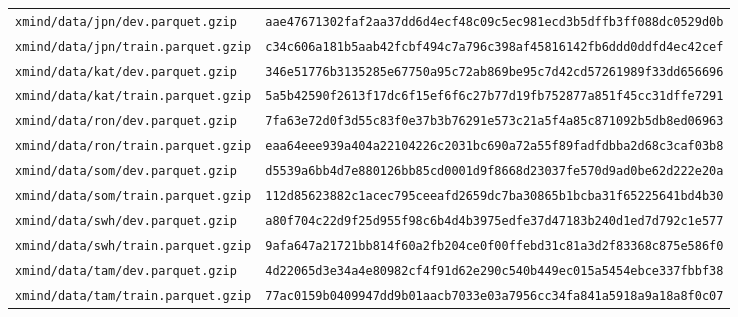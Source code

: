 \begin{longtable}{p{5.0cm}p{9.5cm}}
\texttt{\scriptsize xmind/data/jpn/dev.parquet.gzip} & \texttt{\scriptsize aae47671302faf2aa37dd6d4ecf48c09\hspace{0pt}c5ec981ecd3b5dffb3ff088dc0529d0b}\\
\texttt{\scriptsize xmind/data/jpn/train.parquet.gzip} & \texttt{\scriptsize c34c606a181b5aab42fcbf494c7a796c\hspace{0pt}398af45816142fb6ddd0ddfd4ec42cef}\\
\texttt{\scriptsize xmind/data/kat/dev.parquet.gzip} & \texttt{\scriptsize 346e51776b3135285e67750a95c72ab8\hspace{0pt}69be95c7d42cd57261989f33dd656696}\\
\texttt{\scriptsize xmind/data/kat/train.parquet.gzip} & \texttt{\scriptsize 5a5b42590f2613f17dc6f15ef6f6c27b\hspace{0pt}77d19fb752877a851f45cc31dffe7291}\\
\texttt{\scriptsize xmind/data/ron/dev.parquet.gzip} & \texttt{\scriptsize 7fa63e72d0f3d55c83f0e37b3b76291e\hspace{0pt}573c21a5f4a85c871092b5db8ed06963}\\
\texttt{\scriptsize xmind/data/ron/train.parquet.gzip} & \texttt{\scriptsize eaa64eee939a404a22104226c2031bc6\hspace{0pt}90a72a55f89fadfdbba2d68c3caf03b8}\\
\texttt{\scriptsize xmind/data/som/dev.parquet.gzip} & \texttt{\scriptsize d5539a6bb4d7e880126bb85cd0001d9f\hspace{0pt}8668d23037fe570d9ad0be62d222e20a}\\
\texttt{\scriptsize xmind/data/som/train.parquet.gzip} & \texttt{\scriptsize 112d85623882c1acec795ceeafd2659d\hspace{0pt}c7ba30865b1bcba31f65225641bd4b30}\\
\texttt{\scriptsize xmind/data/swh/dev.parquet.gzip} & \texttt{\scriptsize a80f704c22d9f25d955f98c6b4d4b397\hspace{0pt}5edfe37d47183b240d1ed7d792c1e577}\\
\texttt{\scriptsize xmind/data/swh/train.parquet.gzip} & \texttt{\scriptsize 9afa647a21721bb814f60a2fb204ce0f\hspace{0pt}00ffebd31c81a3d2f83368c875e586f0}\\
\texttt{\scriptsize xmind/data/tam/dev.parquet.gzip} & \texttt{\scriptsize 4d22065d3e34a4e80982cf4f91d62e29\hspace{0pt}0c540b449ec015a5454ebce337fbbf38}\\
\texttt{\scriptsize xmind/data/tam/train.parquet.gzip} & \texttt{\scriptsize 77ac0159b0409947dd9b01aacb7033e0\hspace{0pt}3a7956cc34fa841a5918a9a18a8f0c07}\\

\end{longtable}
